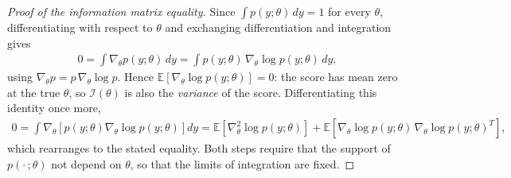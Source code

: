 \documentclass[11pt]{article}
\theoremstyle{definition}
\theoremstyle{plain}
\theoremstyle{remark}
\begin{document}
\begin{proof}[Proof of the information matrix equality]
    Since $\int p(y;\theta)\,dy = 1$ for every $\theta$, differentiating with respect to $\theta$ and exchanging differentiation and integration gives
    \begin{align}
        0 = \int \nabla_\theta p(y;\theta)\,dy = \int p(y;\theta)\,\nabla_\theta\log p(y;\theta)\,dy,
    \end{align}
    using $\nabla_\theta p = p\,\nabla_\theta \log p$. Hence $\mathbb{E}[\nabla_\theta\log p(y;\theta)] = 0$: the score has mean zero at the true $\theta$, so $\mathcal{I}(\theta)$ is also the \emph{variance} of the score. Differentiating this identity once more,
    \begin{align}
        0 = \int \nabla_\theta\!\left[p(y;\theta)\nabla_\theta\log p(y;\theta)\right]dy = \mathbb{E}\!\left[\nabla^2_\theta\log p(y;\theta)\right] + \mathbb{E}\!\left[\nabla_\theta\log p(y;\theta)\,\nabla_\theta\log p(y;\theta)^T\right],
    \end{align}
    which rearranges to the stated equality. Both steps require that the support of $p(\cdot\,;\theta)$ not depend on $\theta$, so that the limits of integration are fixed.
\end{proof}
\end{document}
